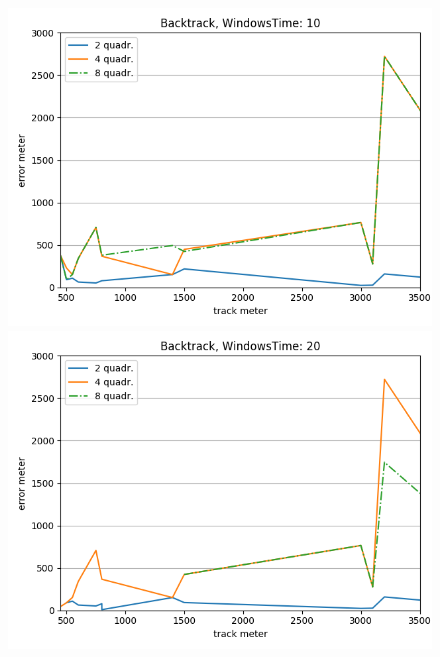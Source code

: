 \documentclass[12pt,a4paper,openright,twoside]{report}
\begin{document}
\begin{figure}[H]
\centering  
\includegraphics[scale=0.4]{thirdChartBacktrack-10} 
\includegraphics[scale=0.4]{thirdChartBacktrack-20} 
\end{figure}
\end{document}
